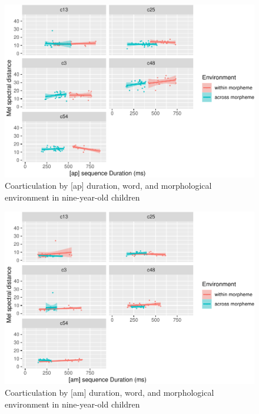 \documentclass[
]{article}
\begin{document}
\begin{figure}
\centering
\includegraphics{3_ch3_results_files/figure-latex/nine-facet-ap-1.pdf}
\caption{\label{fig:nine-facet-ap}Coarticulation by {[}ap{]} duration, word, and morphological environment in nine-year-old children}
\end{figure}

\begin{figure}
\centering
\includegraphics{3_ch3_results_files/figure-latex/nine-facet-am-1.pdf}
\caption{\label{fig:nine-facet-am}Coarticulation by {[}am{]} duration, word, and morphological environment in nine-year-old children}
\end{figure}
\end{document}
